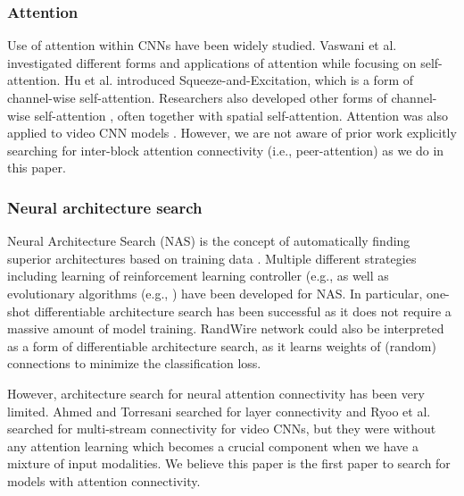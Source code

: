 \documentclass[runningheads]{llncs}
\begin{document}
\subsubsection{Attention}

Use of attention within CNNs have been widely studied. Vaswani et al. \cite{vaswani2017attention} investigated different forms and applications of attention while focusing on self-attention. Hu et al. \cite{hu2018squeeze} introduced Squeeze-and-Excitation, which is a form of channel-wise self-attention. Researchers also developed other forms of channel-wise self-attention \cite{woo2018cbam,fu2019dual,huang2019ccnet,li19em,wang2019eca}, often together with spatial self-attention. Attention was also applied to video CNN models \cite{piergiovanni2017learning,long2018attention,das2019toyota}. However, we are not aware of prior work explicitly searching for inter-block attention connectivity (i.e., peer-attention) as we do in this paper.

\subsubsection{Neural architecture search}

Neural Architecture Search (NAS) is the concept of automatically finding superior architectures based on training data \cite{zoph2017neural,zoph2018nas,liu2018progressive,real2019amoeba,tan2019efficient}. Multiple different strategies including learning of reinforcement learning controller (e.g., \cite{zoph2017neural,zoph2018nas} as well as evolutionary algorithms (e.g., \cite{real2019amoeba}) have been developed for NAS. In particular, one-shot differentiable architecture search \cite{bender2018understanding,liu2019darts} has been successful as it does not require a massive amount of model training. RandWire network \cite{randwire} could also be interpreted as a form of differentiable architecture search, as it learns weights of (random) connections to minimize the classification loss.


However, architecture search for neural attention connectivity has been very limited. Ahmed and Torresani \cite{ahmed2017connectivity} searched for layer connectivity and Ryoo et al. \cite{ryoo2019assemblenet} searched for multi-stream connectivity for video CNNs, but they were without any attention learning which becomes a crucial component when we have a mixture of input modalities. We believe this paper is the first paper to search for models with attention connectivity.
\end{document}
